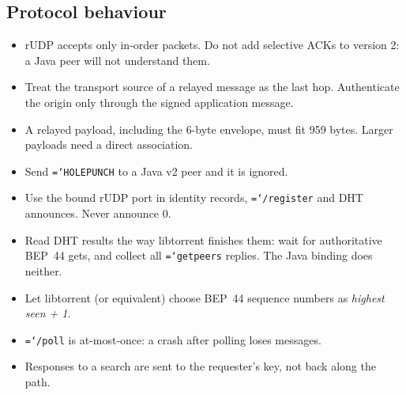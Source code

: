\documentclass[11pt,a4paper]{article}
\newcommand{\code}[1]{\texttt{\hyphenchar\font=`\-\relax #1}}
\DeclareRobustCommand{\_}{\origunderscore\allowbreak}
\begin{document}
\subsection{Protocol behaviour}
\begin{itemize}
\item rUDP accepts only in-order packets. Do not add selective ACKs to version 2: a Java peer
  will not understand them.
\item Treat the transport source of a relayed message as the last hop. Authenticate the
  origin only through the signed application message.
\item A relayed payload, including the 6-byte envelope, must fit 959 bytes. Larger payloads
  need a direct association.
\item Send \code{HOLE\_PUNCH} to a Java v2 peer and it is ignored.
\item Use the bound rUDP port in identity records, \code{/register} and DHT announces. Never
  announce 0.
\item Read DHT results the way libtorrent finishes them: wait for authoritative BEP~44 gets,
  and collect all \code{get\_peers} replies. The Java binding does neither.
\item Let libtorrent (or equivalent) choose BEP~44 sequence numbers as \emph{highest seen + 1}.
\item \code{/poll} is at-most-once: a crash after polling loses messages.
\item Responses to a search are sent to the requester's key, not back along the path.
\end{itemize}
\end{document}

